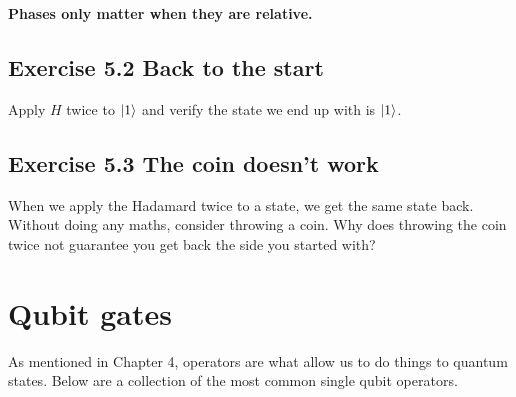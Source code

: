 \documentclass{book}
\begin{document}
\textbf{Phases only matter when they are relative.}

\hline

\subsection{Exercise 5.2 Back to the start}

Apply $H$ twice to $\ket{1}$ and verify the state we end up with is $\ket{1}$. 

\subsection{Exercise 5.3 The coin doesn't work}

When we apply the Hadamard twice to a state, we get the same state back. Without doing any maths, consider throwing a coin. Why does throwing the coin twice not guarantee you get back the side you started with? 

\vspace{5mm} %

\hline \section{Qubit gates }

As mentioned in Chapter 4, operators are what allow us to do things to quantum states. Below are a collection of the most common single qubit operators. 
\end{document}
